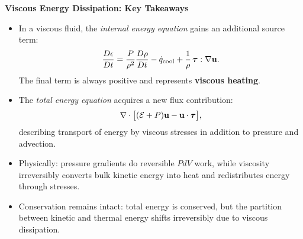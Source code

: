 \begin{bigidea}
\textbf{Viscous Energy Dissipation: Key Takeaways}
\begin{itemize}
    \item In a viscous fluid, the \emph{internal energy equation} gains an additional source term:
    \[
    \frac{D\epsilon}{Dt} = \frac{P}{\rho^2}\frac{D\rho}{Dt} - \dot{q}_{\rm cool} 
    + \frac{1}{\rho}\,\boldsymbol{\tau}:\nabla{\bf u}.
    \]
    The final term is always positive and represents \textbf{viscous heating}.
    
    \item The \emph{total energy equation} acquires a new flux contribution:
    \[
    \nabla \cdot \big[(\mathcal{E}+P){\bf u} - {\bf u}\cdot \boldsymbol{\tau}\big],
    \]
    describing transport of energy by viscous stresses in addition to pressure and advection.
    
    \item Physically: pressure gradients do reversible $PdV$ work, while viscosity irreversibly 
    converts bulk kinetic energy into heat and redistributes energy through stresses.
    
    \item Conservation remains intact: total energy is conserved, but the partition between 
    kinetic and thermal energy shifts irreversibly due to viscous dissipation.
\end{itemize}
\end{bigidea}
